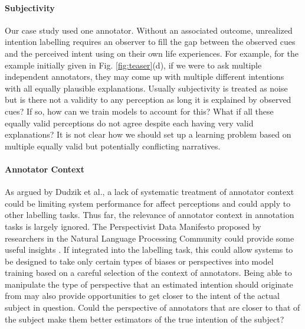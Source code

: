 \documentclass[sigconf]{acmart}
\begin{document}
\paragraph {Subjectivity}
Our case study used one annotator. Without an associated outcome, unrealized intention labelling requires an observer to fill the gap between the observed cues and the perceived intent using on their own life experiences. For example, for the example initially given in Fig. \ref{fig:teaser}(d), if we were to ask multiple independent annotators, they may come up with multiple different intentions with all equally plausible explanations.
Usually subjectivity is treated as noise but is there not a validity to any perception as long it is explained by observed cues? If so, how can we train models to account for this? What if all these equally valid perceptions do not agree despite each having very valid explanations? It is not clear how we should set up a learning problem based on multiple equally valid but potentially conflicting narratives.

\paragraph {Annotator Context}
As argued by Dudzik et al., a lack of systematic treatment of annotator context could be limiting system performance for affect perceptions \cite{dudzik2019context} and could apply to other labelling tasks. Thus far, the relevance of annotator context in annotation tasks is largely ignored. The Perspectivist Data Manifesto proposed by researchers in the Natural Language Processing Community could provide some useful insights \cite{Cabitza2023}. If integrated into the labelling task, this could allow systems to be designed to take only certain types of biases or perspectives into model training based on a careful selection of the context of annotators. Being able to manipulate the type of perspective that an estimated intention should originate from may also provide opportunities to get closer to the intent of the actual subject in question. Could the perspective of annotators that are closer to that of the subject make them better estimators of the true intention of the subject?
\end{document}
